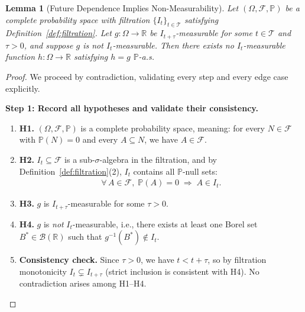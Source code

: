 \documentclass[12pt,openany]{book}
\newcommand{\calI}{\mathcal{I}}
\numberwithin{equation}{chapter}
\theoremstyle{plain}
\newtheorem{lemma}[theorem]{Lemma}
\theoremstyle{definition}
\theoremstyle{remark}
\numberwithin{equation}{chapter}
\theoremstyle{plain}
\def\calI{I}%
\begin{document}
\begin{lemma}[Future Dependence Implies Non-Measurability]
\label{lem:future-dep}
Let $(\Omega, \mathcal{F}, \mathbb{P})$ be a complete probability
space with filtration $\{\calI_t\}_{t \in \mathcal{T}}$ satisfying
Definition~\ref{def:filtration}.  Let
$g : \Omega \to \mathbb{R}$ be $\calI_{t+\tau}$-measurable for
some $t \in \mathcal{T}$ and $\tau > 0$, and suppose $g$ is
\emph{not} $\calI_t$-measurable.  Then there exists no
$\calI_t$-measurable function $h : \Omega \to \mathbb{R}$
satisfying $h = g$ $\mathbb{P}$-a.s.
\end{lemma}

\begin{proof}
We proceed by contradiction, validating every step and every
edge case explicitly.

\medskip
\noindent\textbf{Step 1: Record all hypotheses and validate their
consistency.}
\begin{enumerate}
  \item \textbf{H1.} $(\Omega, \mathcal{F}, \mathbb{P})$ is a
        complete probability space, meaning: for every
        $N \in \mathcal{F}$ with $\mathbb{P}(N) = 0$ and every
        $A \subseteq N$, we have $A \in \mathcal{F}$.
  \item \textbf{H2.} $\calI_t \subseteq \mathcal{F}$ is a
        sub-$\sigma$-algebra in the filtration, and by
        Definition~\ref{def:filtration}(2), $\calI_t$ contains
        all $\mathbb{P}$-null sets:
        \begin{align}
          \forall\, A \in \mathcal{F},\;
          \mathbb{P}(A) = 0
          \;\Longrightarrow\;
          A \in \calI_t.
        \end{align}
  \item \textbf{H3.} $g$ is $\calI_{t+\tau}$-measurable for
        some $\tau > 0$.
  \item \textbf{H4.} $g$ is \emph{not} $\calI_t$-measurable,
        i.e., there exists at least one Borel set
        $B^* \in \mathcal{B}(\mathbb{R})$ such that
        $g^{-1}(B^*) \notin \calI_t$.
  \item \textbf{Consistency check.}  Since $\tau > 0$, we have
        $t < t + \tau$, so by filtration monotonicity
        $\calI_t \subsetneq \calI_{t+\tau}$ (strict inclusion is
        consistent with H4).  No contradiction arises among H1--H4.
\end{enumerate}


\end{proof}
\end{document}
